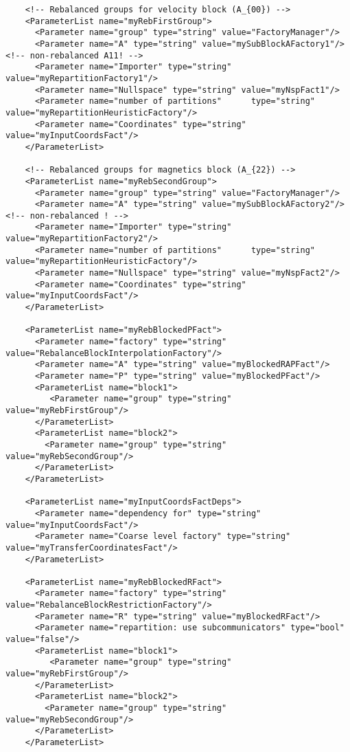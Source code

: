 \documentclass[10pt,fleqn]{book}
\begin{document}
\begin{lstlisting}
    <!-- Rebalanced groups for velocity block (A_{00}) -->
    <ParameterList name="myRebFirstGroup">
      <Parameter name="group" type="string" value="FactoryManager"/>
      <Parameter name="A" type="string" value="mySubBlockAFactory1"/> <!-- non-rebalanced A11! -->
      <Parameter name="Importer" type="string" value="myRepartitionFactory1"/>
      <Parameter name="Nullspace" type="string" value="myNspFact1"/>
      <Parameter name="number of partitions"      type="string"  value="myRepartitionHeuristicFactory"/>
      <Parameter name="Coordinates" type="string" value="myInputCoordsFact"/>
    </ParameterList>

    <!-- Rebalanced groups for magnetics block (A_{22}) -->
    <ParameterList name="myRebSecondGroup">
      <Parameter name="group" type="string" value="FactoryManager"/>
      <Parameter name="A" type="string" value="mySubBlockAFactory2"/> <!-- non-rebalanced ! -->
      <Parameter name="Importer" type="string" value="myRepartitionFactory2"/>
      <Parameter name="number of partitions"      type="string"  value="myRepartitionHeuristicFactory"/>
      <Parameter name="Nullspace" type="string" value="myNspFact2"/>
      <Parameter name="Coordinates" type="string" value="myInputCoordsFact"/>
    </ParameterList>

    <ParameterList name="myRebBlockedPFact">
      <Parameter name="factory" type="string" value="RebalanceBlockInterpolationFactory"/>
      <Parameter name="A" type="string" value="myBlockedRAPFact"/>
      <Parameter name="P" type="string" value="myBlockedPFact"/>
      <ParameterList name="block1">
         <Parameter name="group" type="string" value="myRebFirstGroup"/>
      </ParameterList>
      <ParameterList name="block2">
        <Parameter name="group" type="string" value="myRebSecondGroup"/>
      </ParameterList>
    </ParameterList>

    <ParameterList name="myInputCoordsFactDeps">
      <Parameter name="dependency for" type="string" value="myInputCoordsFact"/>
      <Parameter name="Coarse level factory" type="string" value="myTransferCoordinatesFact"/>
    </ParameterList>

    <ParameterList name="myRebBlockedRFact">
      <Parameter name="factory" type="string" value="RebalanceBlockRestrictionFactory"/>
      <Parameter name="R" type="string" value="myBlockedRFact"/>
      <Parameter name="repartition: use subcommunicators" type="bool" value="false"/>
      <ParameterList name="block1">
         <Parameter name="group" type="string" value="myRebFirstGroup"/>
      </ParameterList>
      <ParameterList name="block2">
        <Parameter name="group" type="string" value="myRebSecondGroup"/>
      </ParameterList>
    </ParameterList>


\end{lstlisting}
\end{document}
